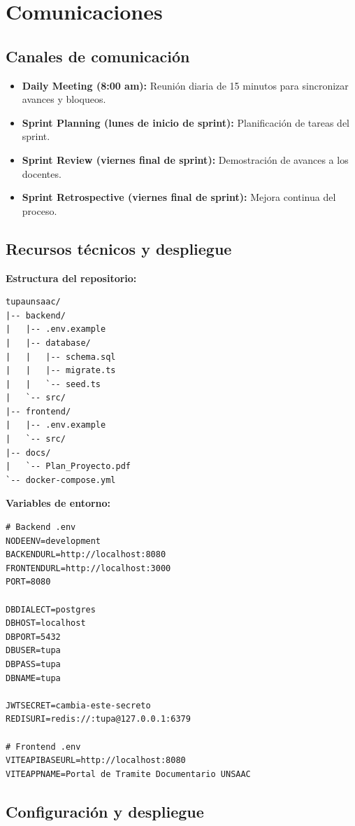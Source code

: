 \section{Comunicaciones}

\subsection{Canales de comunicación}

\begin{itemize}
    \item \textbf{Daily Meeting (8:00 am):} Reunión diaria de 15 minutos para sincronizar avances y bloqueos.
    \item \textbf{Sprint Planning (lunes de inicio de sprint):} Planificación de tareas del sprint.
    \item \textbf{Sprint Review (viernes final de sprint):} Demostración de avances a los docentes.
    \item \textbf{Sprint Retrospective (viernes final de sprint):} Mejora continua del proceso.
\end{itemize}

\subsection{Recursos técnicos y despliegue}

\textbf{Estructura del repositorio:}
\begin{verbatim}
tupaunsaac/
|-- backend/
|   |-- .env.example
|   |-- database/
|   |   |-- schema.sql
|   |   |-- migrate.ts
|   |   `-- seed.ts
|   `-- src/
|-- frontend/
|   |-- .env.example
|   `-- src/
|-- docs/
|   `-- Plan_Proyecto.pdf
`-- docker-compose.yml
\end{verbatim}

\textbf{Variables de entorno:}
\begin{verbatim}
# Backend .env
NODEENV=development
BACKENDURL=http://localhost:8080
FRONTENDURL=http://localhost:3000
PORT=8080

DBDIALECT=postgres
DBHOST=localhost
DBPORT=5432
DBUSER=tupa
DBPASS=tupa
DBNAME=tupa

JWTSECRET=cambia-este-secreto
REDISURI=redis://:tupa@127.0.0.1:6379

# Frontend .env
VITEAPIBASEURL=http://localhost:8080
VITEAPPNAME=Portal de Tramite Documentario UNSAAC
\end{verbatim}

\subsection{Configuración y despliegue}

